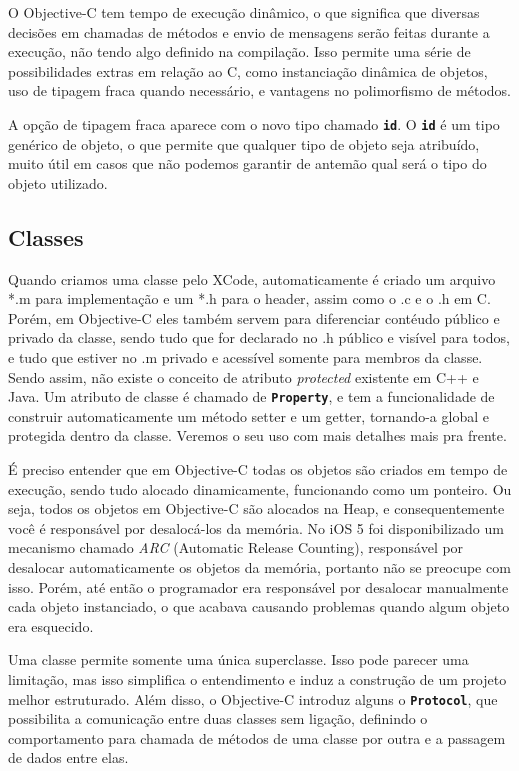 \documentclass[a4paper,12pt,brazil,doubleside]{book}
\begin{document}
\begin{singlespace}
O Objective-C tem tempo de execução dinâmico, o que significa que diversas decisões em chamadas de métodos e envio de mensagens serão feitas durante a execução, não tendo algo definido na compilação. Isso permite uma série de possibilidades extras em relação ao C, como instanciação dinâmica de objetos, uso de tipagem fraca quando necessário, e vantagens no polimorfismo de métodos.

A opção de tipagem fraca aparece com o novo tipo chamado \texttt{\textbf{id}}. O \texttt{\textbf{id}} é um tipo genérico de objeto, o que permite que qualquer tipo de objeto seja atribuído, muito útil em casos que não podemos garantir de antemão qual será o tipo do objeto utilizado.

\subsection{Classes}

Quando criamos uma classe pelo XCode, automaticamente é criado um arquivo *.m para implementação e um *.h para o header, assim como o .c e o .h em C. Porém, em Objective-C eles também servem para diferenciar contéudo público e privado da classe, sendo tudo que for declarado no .h público e visível para todos, e tudo que estiver no .m privado e acessível somente para membros da classe. Sendo assim, não existe o conceito de atributo \emph{protected} existente em C++ e Java. Um atributo de classe é chamado de \texttt{\textbf{Property}}, e tem a funcionalidade de construir automaticamente um método setter e um getter, tornando-a global e protegida dentro da classe. Veremos o seu uso com mais detalhes mais pra frente.


É preciso entender que em Objective-C todas os objetos são criados em tempo de execução, sendo tudo alocado dinamicamente, funcionando como um ponteiro. Ou seja, todos os objetos em Objective-C são alocados na Heap, e consequentemente você é responsável por desalocá-los da memória. No iOS 5 foi disponibilizado um mecanismo chamado \emph{ARC} (Automatic Release Counting), responsável por desalocar automaticamente os objetos da memória, portanto não se preocupe com isso. Porém, até então o programador era responsável por desalocar manualmente cada objeto instanciado, o que acabava causando problemas quando algum objeto era esquecido.

Uma classe permite  somente uma única superclasse. Isso pode parecer uma limitação, mas isso simplifica o entendimento e induz a construção de um projeto melhor estruturado. Além disso, o Objective-C introduz alguns o \texttt{\textbf{Protocol}}, que possibilita a comunicação entre duas classes sem ligação, definindo o comportamento para chamada de métodos de uma classe por outra e a passagem de dados entre elas.



\end{singlespace}
\end{document}

